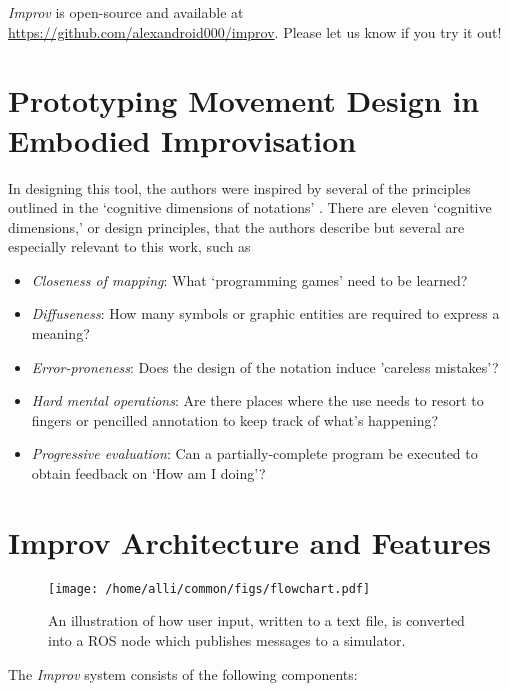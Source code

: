 \documentclass[sigconf]{acmart}
\begin{document}
\emph{Improv} is open-source and available at
\url{https://github.com/alexandroid000/improv}. Please let us know if you try it
out!



\section{Prototyping Movement Design in Embodied Improvisation}\label{embodied}

In designing this tool, the authors were inspired by several of the principles
outlined in the `cognitive dimensions of notations' \cite{green1996usability}.
There are eleven `cognitive dimensions,' or design principles, that the authors
describe but several are especially relevant to this work, such as

\begin{itemize}
\item \emph{Closeness of mapping}: What `programming games' need to be learned?
\item \emph{Diffuseness}: How many symbols or graphic entities are required to express a meaning?
\item \emph{Error-proneness}: Does the design of the notation induce 'careless mistakes'?
\item \emph{Hard mental operations}: Are there places where the use needs to resort to  fingers or pencilled annotation to keep track of what's happening?
\item \emph{Progressive evaluation}: Can a partially-complete program be executed to
obtain feedback on `How am I doing'?
\end{itemize}

\section{Improv Architecture and Features}\label{architecture-overview}

\begin{figure}[h]
\centering
\texttt{[image: /home/alli/common/figs/flowchart.pdf]}
\caption{An illustration of how user input, written to a text file, is
converted into a ROS node which publishes messages to a simulator.
\label{flowchart}}
\end{figure}

The \emph{Improv} system consists of the following components:
\end{document}
